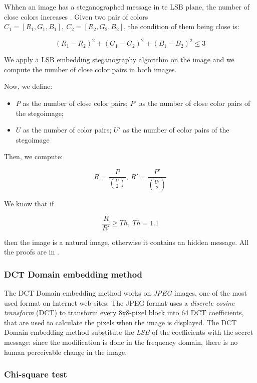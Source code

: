 \documentclass[../../main.tex]{subfiles}
\begin{document}
    Whhen an image has a steganographed message in te LSB plane, the number of
    close colors increases \cite{detecting-lsb-steganography}. Given two pair of
    colors $C_1=[R_1,G_1,B_1],\ C_2=[R_2,G_2,B_2]$, the condition of them being
    close is:

    \[ (R_1-R_2)^2+(G_1-G_2)^2+(B_1-B_2)^2 \leq 3 \]

    We apply a LSB embedding steganography algorithm on the image and we compute
    the number of close color pairs in both images.

    Now, we define:

    \begin{itemize}
        \item $P$ as the number of close color pairs; $P'$ as the number of
              close color pairs of the stegoimage;
        \item $U$ as the number of color pairs; $U'$ as the number of color
              pairs of the stegoimage
    \end{itemize}

    Then, we compute:

    \[ R = \frac{P}{\binom{U}{2}},\ R' = \frac{P'}{\binom{U'}{2}} \]

    We know that if

    \[ \frac{R}{R'} \geq Th,\ Th = 1.1 \]

    \noindent then the image is a natural image, otherwise it contains an hidden
    message. All the proofs are in \cite{detecting-lsb-steganography}.

    \subsubsection{DCT Domain embedding method}
    The DCT Domain embedding method works on \emph{JPEG} images, one of the most
    used format on Internet web sites.
    The JPEG format uses a \emph{discrete cosine transform} (DCT) to transform
    every 8x8-pixel block into 64 DCT coefficients, that are used to calculate
    the pixels when the image is displayed.
    The DCT Domain embedding method substitute the \emph{LSB} of the
    coefficients with the secret message: since the modification is done in the
    frequency domain, there is no human perceivable change in the image.

    \subsubsection{Chi-square test}
\end{document}
